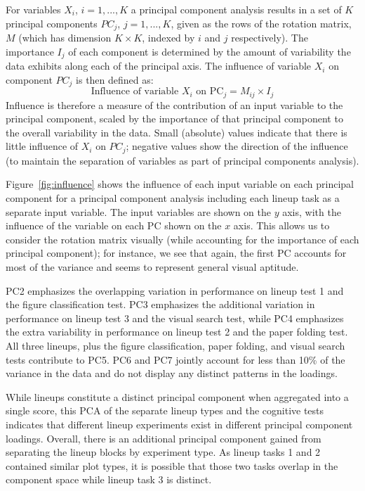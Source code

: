 \documentclass[journal]{vgtc}\usepackage[]{graphicx}\usepackage[]{color}
\begin{document}
For variables $X_i$, $i=1, ..., K$ a principal component analysis results in a set of $K$ principal  components $PC_j$, $j=1, ..., K$, given as the rows of the rotation matrix, $M$ (which has dimension $K\times K$, indexed by $i$ and $j$ respectively).
The importance $I_j$ of each component is determined by the amount of variability the data exhibits along each of the principal axis.
The influence of variable $X_i$ on component $PC_j$ is then defined as:
%
$$\text{Influence of variable } X_i \text{ on PC}_j = M_{ij}\times I_j$$
%
Influence is therefore a measure of the contribution of an input variable to the principal component, scaled by the importance of that principal component to the overall variability in the data. Small (absolute) values indicate that there is little influence of $X_i$ on $PC_j$; negative values show the direction of the influence (to maintain the separation of variables as part of principal components analysis). 

Figure~\ref{fig:influence} shows the influence of each input variable on each principal component for a principal component analysis  including each lineup task as a separate input variable. The input variables are shown on the $y$ axis, with the influence of the variable on each PC shown on the $x$ axis. This allows us to consider the rotation matrix visually (while accounting for the importance of each principal component); for instance, we see that again, the first PC accounts for most of the variance and seems to represent general visual aptitude. 

PC2 emphasizes the overlapping variation in performance on lineup test 1 and the figure classification test. PC3 emphasizes the additional variation in performance on lineup test 3 and the visual search test, while PC4 emphasizes the extra variability in performance on lineup test 2 and the paper folding test. All three lineups, plus the figure classification, paper folding, and visual search tests contribute to PC5. PC6 and PC7 jointly account for less than 10\% of the variance in the data and do not display any distinct patterns in the loadings. 

While lineups constitute a distinct principal component when aggregated into a single score, this PCA of the separate lineup types and the cognitive tests indicates that different lineup experiments exist in different principal component loadings. Overall, there is an additional principal component gained from separating the lineup blocks by experiment type. As lineup tasks 1 and 2 contained similar plot types, it is possible that those two tasks overlap in the component space while lineup task 3 is distinct. 
\end{document}
